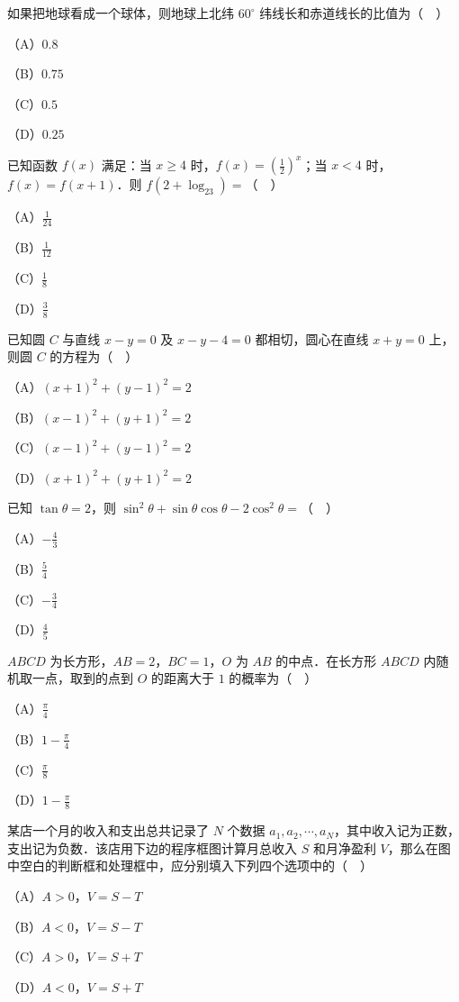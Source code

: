 \begin{question}
如果把地球看成一个球体，则地球上北纬 $60^\circ$ 纬线长和赤道线长的比值为（　）

（A）$0.8$

（B）$0.75$

（C）$0.5$

（D）$0.25$

\end{question}
\begin{question}
已知函数 $f(x)$ 满足：当 $x\geqslant4$ 时，$f(x)=\left(\frac12\right)^x$；当 $x<4$ 时，$f(x)=f(x+1)$．则 $f(2+\log_23)=$（　）

（A）$\frac{1}{24}$

（B）$\frac{1}{12}$

（C）$\frac18$

（D）$\frac38$

\end{question}
\begin{question}
已知圆 $C$ 与直线 $x-y=0$ 及 $x-y-4=0$ 都相切，圆心在直线 $x+y=0$ 上，则圆 $C$ 的方程为（　）

（A）$(x+1)^2+(y-1)^2=2$

（B）$(x-1)^2+(y+1)^2=2$

（C）$(x-1)^2+(y-1)^2=2$

（D）$(x+1)^2+(y+1)^2=2$

\end{question}
\begin{question}
已知 $\tan\theta=2$，则 $\sin^2\theta+\sin\theta\cos\theta-2\cos^2\theta=$（　）

（A）$-\frac43$

（B）$\frac54$

（C）$-\frac34$

（D）$\frac45$

\end{question}
\begin{question}
$ABCD$ 为长方形，$AB=2$，$BC=1$，$O$ 为 $AB$ 的中点．在长方形 $ABCD$ 内随机取一点，取到的点到 $O$ 的距离大于 $1$ 的概率为（　）

（A）$\frac\pi4$

（B）$1-\frac\pi4$

（C）$\frac\pi8$

（D）$1-\frac\pi8$

\Needspace{0.4\textheight}
\end{question}
\begin{question}
某店一个月的收入和支出总共记录了 $N$ 个数据 $a_1,a_2,\cdots,a_N$，其中收入记为正数，支出记为负数．该店用下边的程序框图计算月总收入 $S$ 和月净盈利 $V$，那么在图中空白的判断框和处理框中，应分别填入下列四个选项中的（　）

（A）$A>0$，$V=S-T$

（B）$A<0$，$V=S-T$

（C）$A>0$，$V=S+T$

（D）$A<0$，$V=S+T$
\nopagebreak[4]
\begin{center}\end{center}
\nopagebreak[4]
\end{question}
